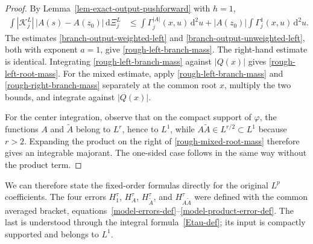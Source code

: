 \documentclass[a4paper,11pt]{article}
\newcommand{\dd}{\,\text{d}}
\theoremstyle{plain}
\theoremstyle{definition}
\theoremstyle{remark}
\begin{document}
\begin{proof}
By Lemma~\ref{lem-exact-output-pushforward} with $h=1$,
\begin{align*}
\int |\mathcal K_j^L|\,|A(s)-A(z_0)|\dd\Xi_j^L
&\le \int \Gamma_j^{|A|}(x,u)\dd^2u
   +|A(z_0)|\int\Gamma_j^1(x,u)\dd^2u.
\end{align*}
The estimates \eqref{branch-output-weighted-left} and
\eqref{branch-output-unweighted-left}, both with exponent $a=1$, give
\eqref{rough-left-branch-mass}.  The right-hand estimate is identical.
Integrating \eqref{rough-left-branch-mass} against $|Q(x)|$ gives
\eqref{rough-left-root-mass}.  For the mixed estimate, apply
\eqref{rough-left-branch-mass} and
\eqref{rough-right-branch-mass} separately at the common root $x$, multiply
the two bounds, and integrate against $|Q(x)|$.

For the center integration, observe that on the compact support of $\varphi$, the functions $A$ and $\widetilde A$ belong to $L^r$, hence to
$L^1$, while
$A\widetilde A\in L^{r/2}\subset L^1$ because $r>2$.  Expanding the product
on the right of \eqref{rough-mixed-root-mass} therefore gives an integrable
majorant.  The one-sided case follows in the same way without the product term.
\end{proof}

We can therefore state the fixed-order formulas directly for the original $L^p$ coefficients.
The four errors $H_1^\tau$, $H_A^\tau$, $H_{\widetilde A}^\tau$, and
$H_{A\widetilde A}^\tau$ were defined with the common averaged bracket,
equations~\eqref{model-errors-def}--\eqref{model-product-error-def}.
The last is understood through the integral formula~\eqref{Etau-def}; its
input is compactly supported and belongs to $L^1$.
\end{document}
